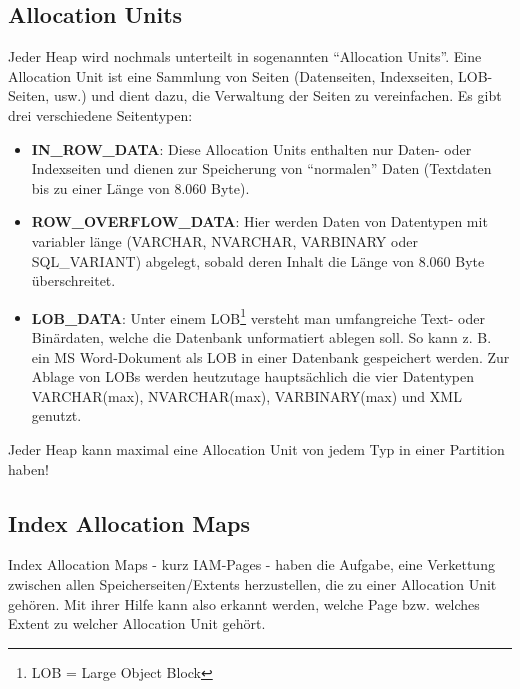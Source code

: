       \subsection{Allocation Units}
        Jeder Heap wird nochmals unterteilt in sogenannten
        \enquote{Allocation Units}. Eine Allocation Unit ist eine Sammlung von
        Seiten (Datenseiten, Indexseiten, LOB-Seiten, usw.) und dient dazu,
        die Verwaltung der Seiten zu vereinfachen. Es gibt drei verschiedene
        Seitentypen:
        \begin{itemize}
            \item \textbf{IN\_ROW\_DATA}: Diese Allocation Units enthalten nur
            Daten- oder Indexseiten und dienen zur Speicherung von
            \enquote{normalen} Daten (Textdaten bis zu einer Länge von 8.060
            Byte).
            \item \textbf{ROW\_OVERFLOW\_DATA}: Hier werden Daten von
            Datentypen mit variabler länge (VARCHAR, NVARCHAR, VARBINARY oder
            SQL\_VARIANT) abgelegt, sobald deren Inhalt die Länge von 8.060
            Byte überschreitet.
            \item \textbf{LOB\_DATA}: Unter einem LOB\footnote{LOB = Large
            Object Block} versteht man umfangreiche Text- oder Binärdaten,
            welche die Datenbank unformatiert ablegen soll. So kann z. B. ein
            MS Word-Dokument als LOB in einer Datenbank gespeichert werden.
            Zur Ablage von LOBs werden heutzutage hauptsächlich die
            vier Datentypen VARCHAR(max), NVARCHAR(max), VARBINARY(max) und XML
            genutzt.
        \end{itemize}
        \begin{merke}
          Jeder Heap kann maximal eine Allocation Unit von jedem Typ in einer
          Partition haben!
        \end{merke}
        \begin{literaturinternet}
          \item \cite{ms175012}
          \item \cite{ms188706}
          \item \cite{ms189051}
        \end{literaturinternet}
      \subsection{Index Allocation Maps}
        Index Allocation Maps - kurz IAM-Pages - haben die Aufgabe, eine
        Verkettung zwischen allen Speicherseiten/Extents herzustellen, die zu
        einer Allocation Unit gehören. Mit ihrer Hilfe kann also erkannt werden,
        welche Page bzw. welches Extent zu welcher Allocation Unit gehört. 
        
